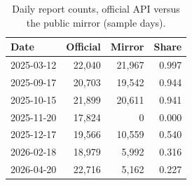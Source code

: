 \begin{table}[!t]\centering\small
\caption{Daily report counts, official API versus the public mirror (sample days).}\label{tab:mirror}
\begin{tabular}{@{}lrrr@{}}\toprule
Date & Official & Mirror & Share\\\midrule
2025-03-12 & 22,040 & 21,967 & 0.997\\
2025-09-17 & 20,703 & 19,542 & 0.944\\
2025-10-15 & 21,899 & 20,611 & 0.941\\
2025-11-20 & 17,824 & 0 & 0.000\\
2025-12-17 & 19,566 & 10,559 & 0.540\\
2026-02-18 & 18,979 & 5,992 & 0.316\\
2026-04-20 & 22,716 & 5,162 & 0.227\\\bottomrule
\end{tabular}\end{table}
